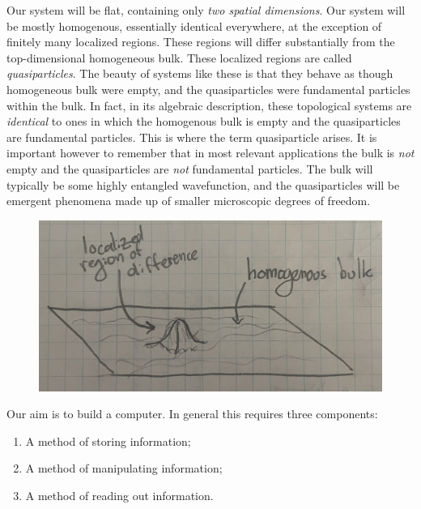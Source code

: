 \documentclass{article}
\theoremstyle{definition}
\numberwithin{figure}{section}
\begin{document}
Our system will be flat, containing only \textit{two spatial dimensions}. Our system will be mostly homogenous, essentially identical everywhere, at the exception of finitely many localized regions. These regions will differ substantially from the top-dimensional homogeneous bulk. These localized regions are called \textit{quasiparticles}. The beauty of systems like these is that they behave as though homogeneous bulk were empty, and the quasiparticles were fundamental particles within the bulk. In fact, in its algebraic description, these topological systems are \textit{identical} to ones in which the homogenous bulk is empty and the quasiparticles are fundamental particles. This is where the term quasiparticle arises. It is important however to remember that in most relevant applications the bulk is \textit{not} empty and the quasiparticles are \textit{not} fundamental particles. The bulk will typically be some highly entangled wavefunction, and the quasiparticles will be emergent phenomena made up of smaller microscopic degrees of freedom.

\begin{figure}[h]
\begin{center}
\includegraphics[scale=.04]{quasiparticle}
\end{center}
\end{figure}

Our aim is to build a computer. In general this requires three components:

\begin{enumerate}
\item A method of storing information;
\item A method of manipulating information;
\item A method of reading out information.
\end{enumerate}
\end{document}
